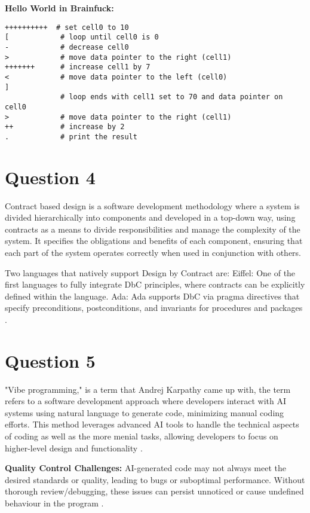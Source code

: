 \documentclass{article}  %
\begin{document}
\textbf{Hello World in Brainfuck:}
\begin{verbatim}
++++++++++  # set cell0 to 10
[            # loop until cell0 is 0
-            # decrease cell0
>            # move data pointer to the right (cell1)
+++++++      # increase cell1 by 7
<            # move data pointer to the left (cell0)
]
             # loop ends with cell1 set to 70 and data pointer on cell0
>            # move data pointer to the right (cell1)
++           # increase by 2
.            # print the result
\end{verbatim}
\cite{BrainFuck}

\section{Question 4}
Contract based design is a software development methodology where a system is divided hierarchically into components and developed in a top-down way, using contracts as a means to divide responsibilities and manage the complexity of the system. It specifies the obligations and benefits of each component, ensuring that each part of the system operates correctly when used in conjunction with others.

Two languages that natively support Design by Contract are: 
Eiffel: One of the first languages to fully integrate DbC principles, where contracts can be explicitly defined within the language.
Ada: Ada supports DbC via pragma directives that specify preconditions, postconditions, and invariants for procedures and packages \cite{10.1007/978-3-031-35257-7_5}.

\section{Question 5}
"Vibe programming," is a term that Andrej Karpathy came up with, the term refers to a software development approach where developers interact with AI systems using natural language to generate code, minimizing manual coding efforts. This method leverages advanced AI tools to handle the technical aspects of coding as well as the more menial tasks, allowing developers to focus on higher-level design and functionality \cite{karpathy_vibe_coding_2025}. 

\textbf{Quality Control Challenges:} AI-generated code may not always meet the desired standards or quality, leading to bugs or suboptimal performance. Without thorough review/debugging, these issues can persist unnoticed or cause undefined behaviour in the program \cite{vibe_coding_medium_2025}.
\end{document}
